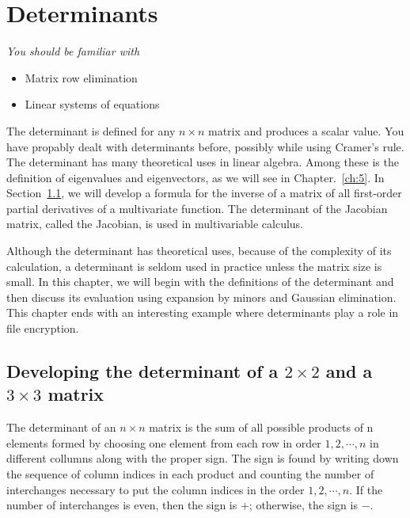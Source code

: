 \documentclass[../main.tex]{subfiles}
\begin{document}

\chapter{Determinants} \label{ch:4}
\noindent\textit{You should be familiar with}
\begin{itemize}[leftmargin=*]
  \setlength{\itemsep}{0pt}
  \setlength{\parskip}{0pt}
  \item Matrix row elimination
  \item Linear systems of equations
\end{itemize}
The determinant is defined for any \(n \times n\) matrix and produces a scalar value. You have propably dealt with determinants before, possibly while using Cramer's rule. The determinant has many theoretical uses in linear algebra. Among these is the definition of eigenvalues and eigenvectors, as we will see in Chapter.~\ref{ch:5}. In Section~\ref{sec:det_devel}, we will develop a formula for the inverse of a matrix of all first-order partial derivatives of a multivariate function. The determinant of the Jacobian matrix, called the Jacobian, is used in multivariable calculus.

Although the determinant has theoretical uses, because of the complexity of its calculation, a determinant is seldom used in practice unless the matrix size is small. In this chapter, we will begin with the definitions of the determinant and then discuss its evaluation using expansion by minors and Gaussian elimination. This chapter ends with an interesting example where determinants play a role in file encryption. \\


\section{Developing the determinant of a \(2 \times 2 \) and a \(3 \times 3\) matrix} \label{sec:det_devel}
\noindent{}The determinant of an \(n \times n\) matrix is the sum of all possible products of n elements formed by choosing one element from each row in order \(1, 2, \cdots, n\) in different collumns along with the proper sign. The sign is found by writing down the sequence of column indices in each product and counting the number of interchanges necessary to put the column indices in the order \(1, 2, \cdots, n\). If the number of interchanges is even, then the sign is \(+\); otherwise, the sign is \(-\).
\end{document}
